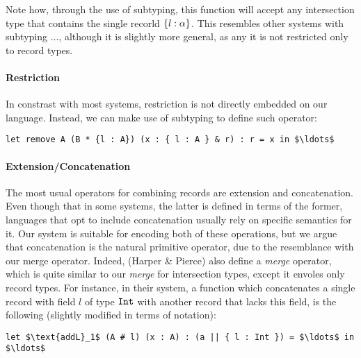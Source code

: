 Note how, through the use of subtyping, this function will accept any intersection type that 
contains the single recorld $\{ l : \alpha \}$.
This resembles other systems with subtyping ..., although it is slightly more general, as any it is not 
restricted only to record types. 

\paragraph{Restriction}

In constrast with most systems, restriction is not directly embedded on our language.
Instead, we can make use of subtyping to define such operator: 
%
\begin{lstlisting}[mathescape=true]
let remove A (B * {l : A}) (x : { l : A } & r) : r = x in $\ldots$ 
\end{lstlisting}

\paragraph{Extension/Concatenation}

The most usual operators for combining records are extension and concatenation.
Even though that in some systems, the latter is defined in terms of the former, languages that
opt to include concatenation usually rely on specific semantics for it. 
Our system is suitable for encoding both of these operations, but we argue that concatenation is
the natural primitive operator, due to the resemblance with our merge operator.
Indeed, (Harper \& Pierce) also define a \emph{merge} operator, which is quite similar to
our \emph{merge} for intersection types, except it envoles only record types.
For instance, in their system, a function which concatenates a single record with field $l$ of type $\texttt{Int}$
with another record that lacks this field, is the following (slightly modified in terms of 
notation):
\begin{lstlisting}[mathescape=true]
let $\text{addL}_1$ (A # l) (x : A) : (a || { l : Int }) = $\ldots$ in $\ldots$ 
\end{lstlisting}

